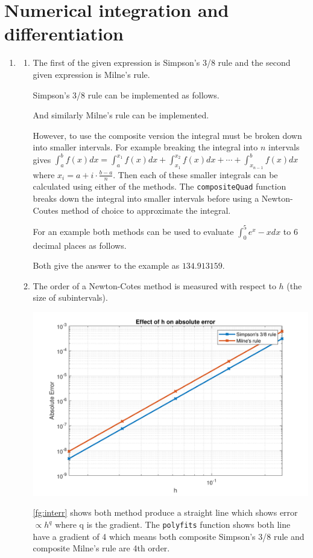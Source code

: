 \documentclass[a4paper,11pt]{article}
\begin{document}
\section{Numerical integration and differentiation}
\begin{enumerate}
	\item \begin{enumerate}
		\item The first of the given expression is Simpson's 3/8 rule and the 
		second given expression is 
		Milne's rule.
		
		Simpson's 3/8 rule can be implemented as follows.
		
		And similarly Milne's rule can be implemented.
		
		However, to use the composite version the integral must be broken 
		down 
		into smaller intervals. For example breaking the integral into $n$ 
		intervals gives $\int_{a}^{b}f(x)dx = \int_{a}^{x_{1}}f(x)dx + 
		\int_{x_{1}}^{x_{2}}f(x)dx + \cdots + \int_{x_{n-1}}^{b}f(x)dx$ 
		where 
		$x_{i} = a + i \cdot \frac{b - a}{n}$. Then each of these smaller 
		integrals can be calculated using either of the methods. The 
		\verb*|compositeQuad| function breaks down the integral into smaller 
		intervals before using a Newton-Coutes method of choice to 
		approximate the integral.
		
		For an example both methods can be used to evaluate $\int_{0}^{5} 
		e^{x} - x dx$ to 6 decimal places as follows.
		
		Both give the answer to the example as $134.913159$.
		
		
		\item The order of a Newton-Cotes method is measured with respect to 
		$h$ (the size of subintervals).
		\begin{center}
			\includegraphics[scale=0.7]{images/Q2aii.pdf}
			\label{fg:interr}
		\end{center}
		\autoref{fg:interr} shows both method produce a straight line which 
		shows error $\propto h^{q}$ where q is the gradient. The 
		\verb*|polyfits| function shows both line have a gradient of 4 which 
		means both composite Simpson's 3/8 rule and composite Milne's rule 
		are 4th order.
		

\end{enumerate}
\end{enumerate}
\end{document}
